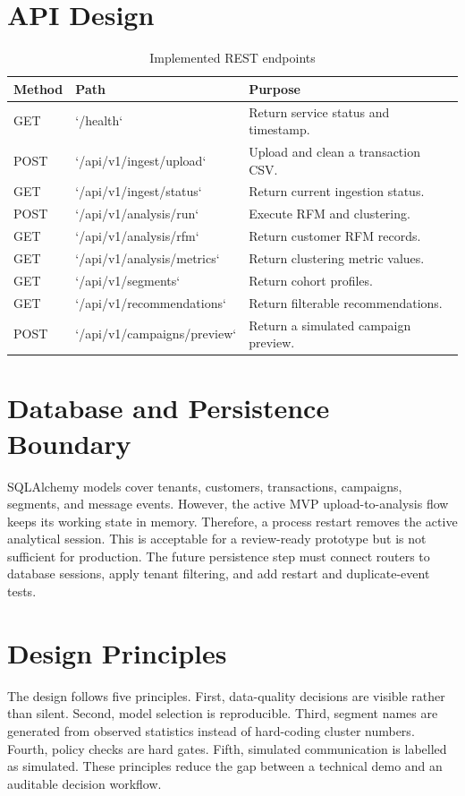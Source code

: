 \documentclass[12pt,a4paper]{report}
\begin{document}
\section{API Design}
\begin{table}[H]
\centering
\caption{Implemented REST endpoints}
\label{tab:api}\small
\begin{tabular}{p{}p{}p{}}
\toprule
Method & Path & Purpose\\\midrule
GET & `/health` & Return service status and timestamp.\\
POST & `/api/v1/ingest/upload` & Upload and clean a transaction CSV.\\
GET & `/api/v1/ingest/status` & Return current ingestion status.\\
POST & `/api/v1/analysis/run` & Execute RFM and clustering.\\
GET & `/api/v1/analysis/rfm` & Return customer RFM records.\\
GET & `/api/v1/analysis/metrics` & Return clustering metric values.\\
GET & `/api/v1/segments` & Return cohort profiles.\\
GET & `/api/v1/recommendations` & Return filterable recommendations.\\
POST & `/api/v1/campaigns/preview` & Return a simulated campaign preview.\\\bottomrule
\end{tabular}
\end{table}

\section{Database and Persistence Boundary}
SQLAlchemy models cover tenants, customers, transactions, campaigns, segments, and message events. However, the active MVP upload-to-analysis flow keeps its working state in memory. Therefore, a process restart removes the active analytical session. This is acceptable for a review-ready prototype but is not sufficient for production. The future persistence step must connect routers to database sessions, apply tenant filtering, and add restart and duplicate-event tests.

\section{Design Principles}
The design follows five principles. First, data-quality decisions are visible rather than silent. Second, model selection is reproducible. Third, segment names are generated from observed statistics instead of hard-coding cluster numbers. Fourth, policy checks are hard gates. Fifth, simulated communication is labelled as simulated. These principles reduce the gap between a technical demo and an auditable decision workflow.
\end{document}
